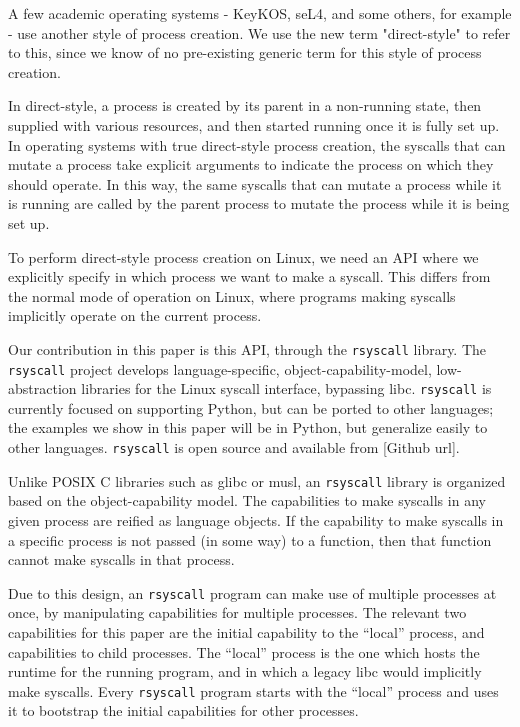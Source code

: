 \documentclass[letterpaper,twocolumn,10pt]{article}
\begin{document}
A few academic operating systems - KeyKOS, seL4, and some others, for example -
use another style of process creation.\cite{keykos}\cite{sel4}\cite{exokernel}\cite{fuschia}\cite{singularity}
We use the new term "direct-style" to refer to this,
since we know of no pre-existing generic term for this style of process creation.

In direct-style, a process is created by its parent in a non-running state,
then supplied with various resources,
and then started running once it is fully set up.
In operating systems with true direct-style process creation,
the syscalls that can mutate a process
take explicit arguments to indicate the process on which they should operate.\cite{keykos}\cite{sel4}
In this way, the same syscalls that can mutate a process while it is running
are called by the parent process to mutate the process while it is being set up.

To perform direct-style process creation on Linux,
we need an API where we explicitly specify in which process we want to make a syscall.
This differs from the normal mode of operation on Linux,
where programs making syscalls implicitly operate on the current process.

Our contribution in this paper is this API, through the \texttt{rsyscall} library.
The \texttt{rsyscall} project develops
language-specific, object-capability-model, low-abstraction libraries for the Linux syscall interface,
bypassing libc.
\texttt{rsyscall} is currently focused on supporting Python,
but can be ported to other languages;
the examples we show in this paper will be in Python,
but generalize easily to other languages.
\texttt{rsyscall} is open source and available from
[Github url].

Unlike POSIX C libraries such as glibc or musl,
an \texttt{rsyscall} library is organized based on the object-capability model.
The capabilities to make syscalls in any given process are reified as language objects.
If the capability to make syscalls in a specific process is not passed (in some way) to a function,
then that function cannot make syscalls in that process.

Due to this design, an \texttt{rsyscall} program can make use of multiple processes at once,
by manipulating capabilities for multiple processes.
The relevant two capabilities for this paper are the initial capability to the ``local'' process,
and capabilities to child processes.
The ``local'' process is the one which hosts the runtime for the running program,
and in which a legacy libc would implicitly make syscalls.
Every \texttt{rsyscall} program starts with the ``local'' process
and uses it to bootstrap the initial capabilities for other processes.
\end{document}
